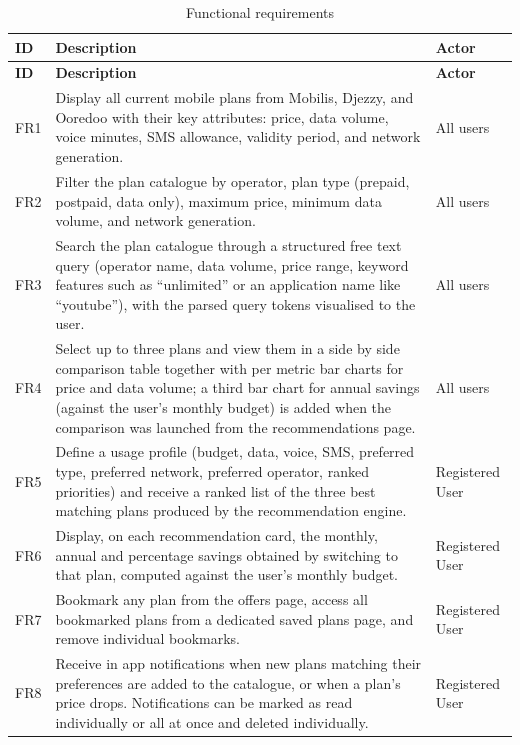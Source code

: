 {\small
\begin{longtable}{|p{1.2cm}|p{9.5cm}|p{3.2cm}|}
  \caption{Functional requirements}\label{tab:fr}\\
    \hline
    \textbf{ID} & \textbf{Description} & \textbf{Actor} \\
    \hline
  \endfirsthead
    \hline
    \textbf{ID} & \textbf{Description} & \textbf{Actor} \\
    \hline
  \endhead
    FR1 & Display all current mobile plans from Mobilis, Djezzy, and Ooredoo with their key attributes: price, data volume, voice minutes, SMS allowance, validity period, and network generation. & All users \\
    \hline
    FR2 & Filter the plan catalogue by operator, plan type (prepaid, postpaid, data only), maximum price, minimum data volume, and network generation. & All users \\
    \hline
    FR3 & Search the plan catalogue through a structured free text query (operator name, data volume, price range, keyword features such as ``unlimited'' or an application name like ``youtube''), with the parsed query tokens visualised to the user. & All users \\
    \hline
    FR4 & Select up to three plans and view them in a side by side comparison table together with per metric bar charts for price and data volume; a third bar chart for annual savings (against the user's monthly budget) is added when the comparison was launched from the recommendations page. & All users \\
    \hline
    FR5 & Define a usage profile (budget, data, voice, SMS, preferred type, preferred network, preferred operator, ranked priorities) and receive a ranked list of the three best matching plans produced by the recommendation engine. & Registered User \\
    \hline
    FR6 & Display, on each recommendation card, the monthly, annual and percentage savings obtained by switching to that plan, computed against the user's monthly budget. & Registered User \\
    \hline
    FR7 & Bookmark any plan from the offers page, access all bookmarked plans from a dedicated saved plans page, and remove individual bookmarks. & Registered User \\
    \hline
    FR8 & Receive in app notifications when new plans matching their preferences are added to the catalogue, or when a plan's price drops. Notifications can be marked as read individually or all at once and deleted individually. & Registered User \\

\end{longtable}}
